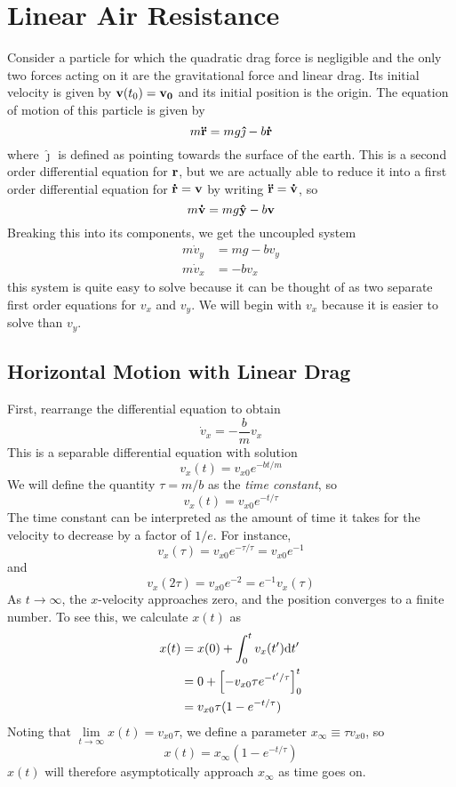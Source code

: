 \section{Linear Air Resistance}
Consider a particle for which the quadratic drag force is negligible and the only two forces acting on it are the gravitational force and linear drag. Its initial velocity is given by $\mathbf{v}(t_0) = \mathbf{v_0}$ and its initial position is the origin. The equation of motion of this particle is given by
\[ m\mathbf{\ddot r} = mg\mathbf{\hat\jmath} - b\mathbf{\dot r} \]
where $\hat{\jmath}$ is defined as pointing towards the surface of the earth. This is a second order differential equation for $\mathbf{r}$, but we are actually able to reduce it into a first order differential equation for $\mathbf{\dot r} = \mathbf{v}$ by writing $\mathbf{\ddot r} = \mathbf{\dot v}$, so
\[ m\mathbf{\dot v} = mg\mathbf{\hat{y}} - b\mathbf{v} \]
Breaking this into its components, we get the uncoupled system 
\begin{align*}
    m\dot v_y &= mg - bv_y \\
    m\dot v_x &= -bv_x 
\end{align*}
this system is quite easy to solve because it can be thought of as two separate first order equations for $v_x$ and $v_y$. We will begin with $v_x$ because it is easier to solve than $v_y$. 
\subsection*{Horizontal Motion with Linear Drag}
First, rearrange the differential equation to obtain
\[ \dot v_x = -\frac{b}{m}v_x\]
This is a separable differential equation with solution
\[ v_x(t) = v_{x0}e^{-bt/m}\]
We will define the quantity $\tau = m/b$ as the \textit{time constant}, so
\[ v_x(t) = v_{x0}e^{-t/\tau} \]
The time constant can be interpreted as the amount of time it takes for the velocity to decrease by a factor of $1/e$. For instance,
\[ v_x(\tau) = v_{x0}e^{-\tau/\tau} = v_{x0}e^{-1} \]
and
\[ v_x(2\tau) = v_{x0}e^{-2} = e^{-1}v_x(\tau)\]
As $t\to\infty$, the $x$-velocity approaches zero, and the position converges to a finite number. To see this, we calculate $x(t)$ as
\begin{align*}
    x(t) &= x(0) + \int_0^t v_x(t')\dd t' \\
    &= 0+ \bqty{-v_{x0}\tau e^{-t'/\tau}}_0^t \\
    &= v_{x0}\tau(1-e^{-t/\tau})
\end{align*}
Noting that $\lim\limits_{t\to\infty} x(t) = v_{x0}\tau$, we define a parameter $x_{\infty}\equiv \tau v_{x0}$, so
\[ x(t) = x_{\infty}(1-e^{-t/\tau})\]
$x(t)$ will therefore asymptotically approach $x_{\infty}$ as time goes on.
